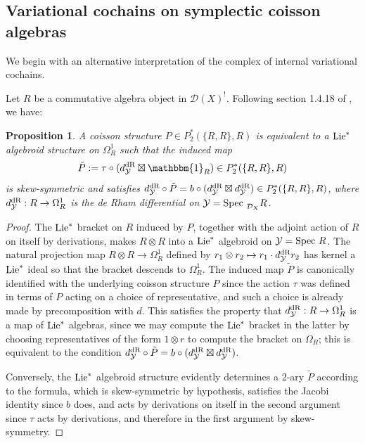 \documentclass[11pt]{amsart}
\numberwithin{equation}{section}
\newtheorem{prop}[theo]{Proposition}
\theoremstyle{definition}
\newcommand{\mc}{\mathcal}
\newcommand{\D}{{\mathcal{D}}}
\newcommand{\Spec}{{\textup{Spec\ }}}
\newcommand{\dR}{{\textup{dR}}}
\newcommand{\Lie}{{\textup{Lie}}}
\newcommand{\0}{{\textbf{0}}}
\newcommand{\id}{{\textup{id}}}
\def \id{\mathbbm{1}}
\begin{document}
\subsection{Variational cochains on symplectic coisson algebras}\label{varsympsec}


We begin with an alternative interpretation of the complex of internal variational cochains.

Let $R$ be a commutative algebra object in $\D(X)^!$. Following section 1.4.18 of \cite{BD1}, we have:

\begin{prop}\label{Coisalgdprop} A coisson structure $P\in P_2^*(\{R,R\},R)$ is equivalent to a $\Lie^*$ algebroid structure on $\Omega^1_R$ such that the induced map \[\tilde P:=\tau\circ (d_{\mc Y}^\dR \boxtimes \id_R) \in P_2^*(\{R,R\},R)\] is skew-symmetric and satisfies $d_{\mc Y}^\dR \circ \tilde P = b\circ (d_{\mc Y}^\dR \boxtimes d_{\mc Y}^\dR) \in P_2^*(\{R,R\},R)$, where $d_{\mc Y}^\dR:R\to \Omega_R^1$ is the de Rham differential on $\mc Y=\Spec_{\mc D_X} R$.
\end{prop}
\begin{proof} The $\Lie^*$ bracket on $R$ induced by $P$, together with the adjoint action of $R$ on itself by derivations, makes $R\otimes R$ into a $\Lie^*$ algebroid on $\mc Y=\Spec R$. The natural projection map $R\otimes R \to \Omega^1_R$ defined by $r_1\otimes r_2 \mapsto r_1 \cdot  d_{\mc Y}^\dR r_2$ has kernel a $\Lie^*$ ideal so that the bracket descends to $\Omega_R^1$. The induced map $\tilde P$ is canonically identified with the underlying coisson structure $P$ since the action $\tau$ was defined in terms of $P$ acting on a choice of representative, and such a choice is already made by precomposition with $d$. This satisfies the property that $d_{\mc Y}^\dR:R \to \Omega^1_R$ is a map of $\Lie^*$ algebras, since we may compute the $\Lie^*$ bracket in the latter by choosing representatives of the form $1\otimes r$ to compute the bracket on $\Omega_R$; this is equivalent to the condition $d_{\mc Y}^\dR \circ \tilde P = b\circ (d_{\mc Y}^\dR \boxtimes d_{\mc Y}^\dR)$.
	
	Conversely, the $\Lie^*$ algebroid structure evidently determines a 2-ary $\tilde{P}$ according to the formula, which is skew-symmetric by hypothesis, satisfies the Jacobi identity since $b$ does, and acts by derivations on itself in the second argument since $\tau$ acts by derivations, and therefore in the first argument by skew-symmetry.
\end{proof}
\end{document}
